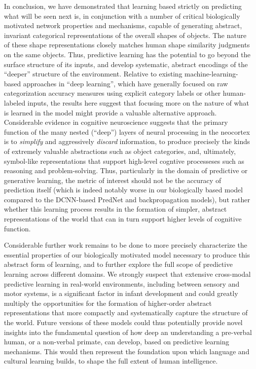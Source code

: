 \documentclass[12pt,twoside]{naturefigs}  %
\newif\myifpdf
\begin{document}
In conclusion, we have demonstrated that learning based strictly on predicting what will be seen next is, in conjunction with a number of critical biologically motivated network properties and mechanisms, capable of generating abstract, invariant categorical representations of the overall shapes of objects.  The nature of these shape representations closely matches human shape similarity judgments on the same objects.  Thus, predictive learning has the potential to go beyond the surface structure of its inputs, and develop systematic, abstract encodings of the ``deeper'' structure of the environment.  Relative to existing machine-learning-based approaches in ``deep learning'', which have generally focused on raw categorization accuracy measures using explicit category labels or other human-labeled inputs, the results here suggest that focusing more on the nature of what is learned in the model might provide a valuable alternative approach.  Considerable evidence in cognitive neuroscience suggests that the primary function of the many nested (``deep'') layers of neural processing in the neocortex is to {\em simplify} and aggressively {\em discard} information\cite{SimonsRensink05}, to produce precisely the kinds of extremely valuable abstractions such as object categories, and, ultimately, symbol-like representations that support high-level cogntive processeses such as reasoning and problem-solving\cite{RougierNoelleBraverEtAl05,OReillyPetrovCohenEtAl14}.  Thus, particularly in the domain of predictive or generative learning, the metric of interest should not be the accuracy of prediction itself (which is indeed notably worse in our biologically based model compared to the DCNN-based PredNet and backpropagation models), but rather whether this learning process results in the formation of simpler, abstract representations of the world that can in turn support higher levels of cognitive function.

Considerable further work remains to be done to more precisely characterize the essential properties of our biologically motivated model necessary to produce this abstract form of learning, and to further explore the full scope of predictive learning across different domains.  We strongly suspect that extensive cross-modal predictive learning in real-world environments, including between sensory and motor systems, is a significant factor in infant development and could greatly multiply the opportunities for the formation of higher-order abstract representations that more compactly and systematically capture the structure of the world\cite{YuSmith12}.  Future versions of these models could thus potentially provide novel insights into the fundamental question of how deep an understanding a pre-verbal human, or a non-verbal primate, can develop\cite{SpelkeBreinlingerMacomberEtAl92,ElmanBatesKarmiloff-SmithEtAl96}, based on predictive learning mechanisms.  This would then represent the foundation upon which language and cultural learning builds, to shape the full extent of human intelligence.
\end{document}
